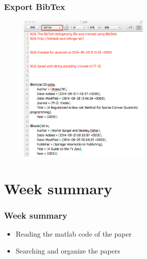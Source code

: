 \documentclass[notheorems,mathserif,table,compress,dvipsnames]{beamer}  %
\begin{document}
%
\begin{frame}
\frametitle{Export BibTex}
\begin{figure}[!ht]
\includegraphics[width=2.5in]{bibdesk6}
\end{figure} 
\end{frame}

\section{Week summary}

%
\begin{frame}
\frametitle{Week summary}
\begin{itemize}
\item Reading the matlab code of the paper
\item Searching and organize the papers
\end{itemize}
\end{frame}
\end{document}
